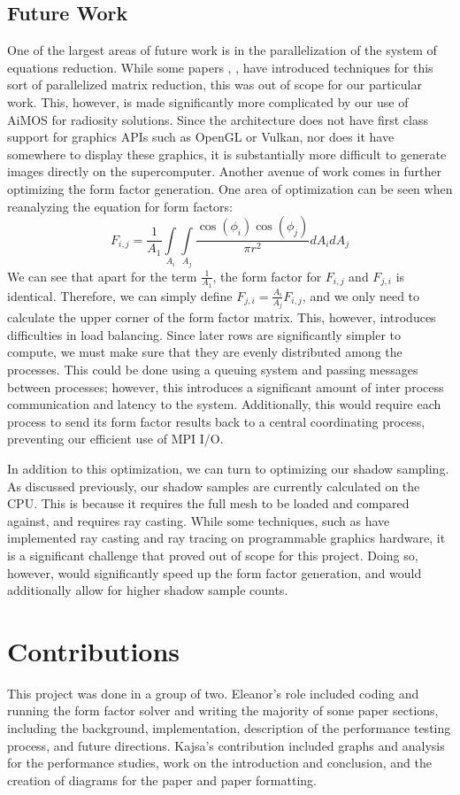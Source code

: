 \documentclass[conference]{IEEEtran}
\begin{document}
\subsection{Future Work}
One of the largest areas of future work is in the parallelization of the system of equations reduction. While some papers \cite{b3}, \cite{b4}, \cite{b7} have introduced techniques for this sort of parallelized matrix reduction, this was out of scope for our particular work. This, however, is made significantly more complicated by our use of AiMOS for radiosity solutions. Since the architecture does not have first class support for graphics APIs such as OpenGL or Vulkan, nor does it have somewhere to display these graphics, it is substantially more difficult to generate images directly on the supercomputer. 
Another avenue of work comes in further optimizing the form factor generation. One area of optimization can be seen when reanalyzing the equation for form factors: 
\[
F_{i,j} = \frac{1}{A_1} \int \limits_{A_i}^{}\int \limits_{A_j}^{}\frac{\cos(\phi_i)\cos(\phi_j)}{\pi r^2} dA_i dA_j
\]
We can see that apart for the term $\frac{1}{A_1}$, the form factor for $F_{i,j}$ and $F_{j,i}$ is identical. Therefore, we can simply define $F_{j,i} = \frac{A_i}{A_j}F_{i,j}$, and we only need to calculate the upper corner of the form factor matrix. This, however, introduces difficulties in load balancing. Since later rows are significantly simpler to compute, we must make sure that they are evenly distributed among the processes. This could be done using a queuing system and passing messages between processes; however, this introduces a significant amount of inter process communication and latency to the system. Additionally, this would require each process to send its form factor results back to a central coordinating process, preventing our efficient use of MPI I/O. 

In addition to this optimization, we can turn to optimizing our shadow sampling. As discussed previously, our shadow samples are currently calculated on the CPU. This is because it requires the full mesh to be loaded and compared against, and requires ray casting. While some techniques, such as \cite{b11} have implemented ray casting and ray tracing on programmable graphics hardware, it is a significant challenge that proved out of scope for this project. Doing so, however, would significantly speed up the form factor generation, and would additionally allow for higher shadow sample counts.
\section{Contributions}
This project was done in a group of two. Eleanor's role included coding and running the form factor solver and writing the majority of some paper sections, including the background, implementation, description of the performance testing process, and future directions. Kajsa's contribution included graphs and analysis for the performance studies, work on the introduction and conclusion, and the creation of diagrams for the paper and paper formatting.
\end{document}
